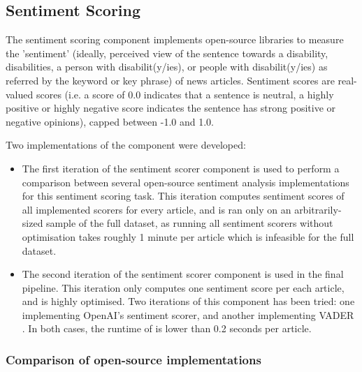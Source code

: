 \documentclass{report}
\newcommand{\textapprox}{\raisebox{0.5ex}{\texttildelow}}  %
\begin{document}
\subsection{Sentiment Scoring} \label{des-sentiment}

The sentiment scoring component implements open-source libraries to measure the 'sentiment' (ideally, perceived view of the sentence towards a disability, disabilities, a person with disabilit(y/ies), or people with disabilit(y/ies) as referred by the keyword or key phrase) of news articles.
Sentiment scores are real-valued scores (i.e. a score of 0.0 indicates that a sentence is neutral, a highly positive or highly negative score indicates the sentence has strong positive or negative opinions), capped between -1.0 and 1.0.

Two implementations of the component were developed: 
\begin{itemize}
	\item The first iteration of the sentiment scorer component is used to perform a comparison between several open-source sentiment analysis implementations for this sentiment scoring task.
		This iteration computes sentiment scores of all implemented scorers for every article, and is ran only on an arbitrarily-sized sample of the full dataset, as running all sentiment scorers without optimisation takes roughly \textapprox1 minute per article which is infeasible for the full dataset.
	\item The second iteration of the sentiment scorer component is used in the final pipeline.
		This iteration only computes one sentiment score per each article, and is highly optimised.
		Two iterations of this component has been tried: one implementing OpenAI's \cite{OpenAI} sentiment scorer, and another implementing VADER \cite{VADER}.
		In both cases, the runtime of is lower than 0.2 seconds per article.
\end{itemize}

\subsubsection{Comparison of open-source implementations} \label{des-sentiment-comparison}
\end{document}
